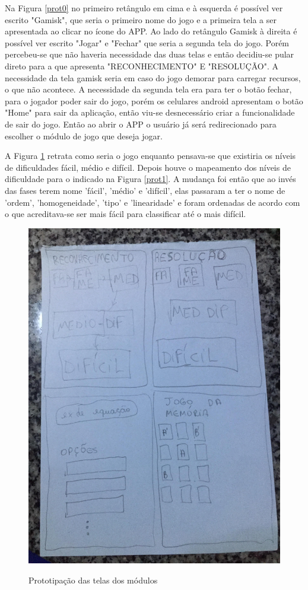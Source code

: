 Na Figura \ref{prot0} no primeiro retângulo em cima e à esquerda é possível ver escrito "Gamisk", que seria o primeiro nome do jogo e a primeira tela a ser apresentada ao clicar no ícone do APP. Ao lado do retângulo Gamisk à direita é possível ver escrito "Jogar" e "Fechar" que seria a segunda tela do jogo. Porém percebeu-se que não haveria necessidade das duas telas e então decidiu-se pular direto para a que apresenta "RECONHECIMENTO" E "RESOLUÇÃO". A necessidade da tela gamisk seria em caso do jogo demorar para carregar recursos, o que não acontece. A necessidade da segunda tela era para ter o botão fechar, para o jogador poder sair do jogo, porém os celulares android apresentam o botão "Home" para sair da aplicação, então viu-se desnecessário criar a funcionalidade de sair do jogo. Então ao abrir o APP o usuário já será redirecionado para escolher o módulo de jogo que deseja jogar.


A Figura \ref{prot2} retrata como seria o jogo enquanto pensava-se que existiria os níveis de dificuldades fácil, médio e difícil. Depois houve o mapeamento dos níveis de dificuldade para o indicado na Figura \ref{prot1}. A mudança foi então que ao invés das fases terem nome 'fácil', 'médio' e 'difícil', elas passaram a ter o nome de 'ordem', 'homogeneidade', 'tipo' e 'linearidade' e foram ordenadas de acordo com o que acreditava-se ser mais fácil para classificar até o mais difícil.


\begin{figure}[H]
\centering
\caption{Prototipação das telas dos módulos}
\includegraphics[scale=0.13]{figuras/prot2.jpg}
\label{prot2}
\end{figure}

